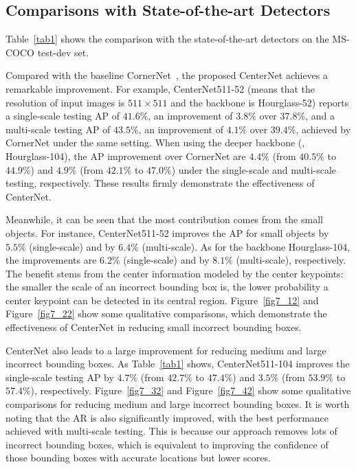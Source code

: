 \documentclass[10pt,twocolumn,letterpaper]{article}
\begin{document}
\subsection{Comparisons with State-of-the-art Detectors}

Table~\ref{tab1} shows the comparison with the state-of-the-art detectors on the MS-COCO test-dev set.

Compared with the baseline CornerNet~\cite{law2018cornernet}, the proposed CenterNet achieves a remarkable improvement. For example, CenterNet511-52 (means that the resolution of input images is $511\times 511$ and the backbone is Hourglass-52) reports a single-scale testing AP of $41.6\%$, an improvement of $3.8\%$ over $37.8\%$, and a multi-scale testing AP of $43.5\%$, an improvement of $4.1\%$ over $39.4\%$, achieved by CornerNet under the same setting. When using the deeper backbone (\ie, Hourglass-104), the AP improvement over CornerNet are $4.4\%$ (from $40.5\%$ to $44.9\%$) and $4.9\%$ (from $42.1\%$ to $47.0\%$) under the single-scale and multi-scale testing, respectively. These results firmly demonstrate the effectiveness of CenterNet.

Meanwhile, it can be seen that the most contribution comes from the small objects. For instance, CenterNet511-52 improves the AP for small objects by $5.5\%$ (single-scale) and by 
$6.4\%$ (multi-scale). As for the backbone Hourglass-104, the improvements are $6.2\%$ (single-scale) and by $8.1\%$ (multi-scale), respectively. The benefit stems from the center information modeled by the center keypoints: the smaller the scale of an incorrect bounding box is, the lower probability a center keypoint can be detected in its central region. Figure~\ref{fig7_12} and Figure~\ref{fig7_22} show some qualitative comparisons, which demonstrate the effectiveness of CenterNet in reducing small incorrect bounding boxes.

CenterNet also leads to a large improvement for reducing medium and large incorrect bounding boxes. As Table~\ref{tab1} shows, CenterNet511-104 improves the single-scale testing AP by $4.7\%$ (from $42.7\%$ to $47.4\%$) and $3.5\%$ (from $53.9\%$ to $57.4\%$), respectively. Figure~\ref{fig7_32} and Figure~\ref{fig7_42} show some qualitative comparisons for reducing medium and large incorrect bounding boxes. It is worth noting that the AR is also significantly improved, with the best performance achieved with multi-scale testing. This is because our approach removes lots of incorrect bounding boxes, which is equivalent to improving the confidence of those bounding boxes with accurate locations but lower scores.
\end{document}
